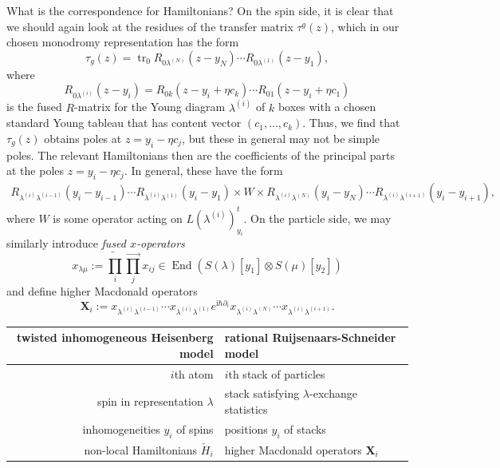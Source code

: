\documentclass[11pt]{report}
\theoremstyle{definition}
\theoremstyle{remark}
\theoremstyle{remark}
\newcommand{\I}{\mathrm{i}}
\begin{document}
What is the correspondence for Hamiltonians? On the spin side, it is clear that we should again look at the residues of the transfer matrix $\tau^g(z)$, which in our chosen monodromy representation has the form
\begin{equation*}
\tau_g(z) = \operatorname{tr}_0 R_{0\lambda^{(N)}}(z-y_N) \cdots R_{0\lambda^{(1)}}(z-y_1),
\end{equation*}
where
\begin{equation*}
R_{0\lambda^{(i)}}(z-y_i) = R_{0k}(z-y_i+\eta c_k) \cdots R_{01}(z-y_i+\eta c_1)
\end{equation*}
is the fused $R$-matrix for the Young diagram $\lambda^{(i)}$ of $k$ boxes with a chosen standard Young tableau that has content vector $(c_1,...,c_k)$. Thus, we find that $\tau_g(z)$ obtains poles at $z = y_i-\eta c_j$, but these in general may not be simple poles. The relevant Hamiltonians then are the coefficients of the principal parts at the poles $z = y_i-\eta c_j$. In general, these have the form
\begin{align*}
R_{\lambda^{(i)}\lambda^{(i-1)}}(y_i-y_{i-1}) \cdots R_{\lambda^{(i)}\lambda^{(1)}}(y_i-y_1) \times W \times R_{\lambda^{(i)}\lambda^{(N)}}(y_i-y_N) \cdots R_{\lambda^{(i)}\lambda^{(i+1)}}(y_i-y_{i+1}),
\end{align*}
where $W$ is some operator acting on $L(\lambda^{(i)})_{y_i}^t$. On the particle side, we may similarly introduce \emph{fused $x$-operators}
\begin{equation*}
x_{\lambda \mu} := \overleftarrow{\prod_i} \overrightarrow{\prod_j} x_{ij} \in \operatorname{End}(S(\lambda)[y_1] \otimes S(\mu)[y_2])
\end{equation*}
and define higher Macdonald operators
\begin{equation*}
\mathbf{X}_i := x_{\lambda^{(i)}\lambda^{(i-1)}} \cdots x_{\lambda^{(i)}\lambda^{(1)}} e^{\I\hbar\partial_i} x_{\lambda^{(i)}\lambda^{(N)}} \cdots x_{\lambda^{(i)}\lambda^{(i+1)}}.
\end{equation*}

\begin{center}
\begin{tabular}{|r||l|}
\hline
twisted inhomogeneous Heisenberg model & rational Ruijsenaars-Schneider model \\
\hline
$i$th atom & $i$th stack of particles \\
spin in representation $\lambda$ & stack satisfying $\lambda$-exchange statistics \\
inhomogeneities $y_i$ of spins & positions $y_i$ of stacks \\
non-local Hamiltonians $\check H_i$ & higher Macdonald operators $\mathbf{X}_i$ \\
\hline
\end{tabular}
\end{center}
\end{document}
